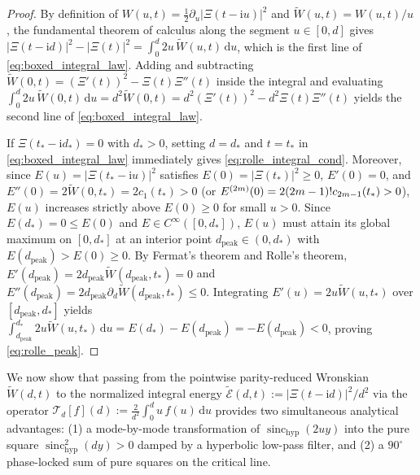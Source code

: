 \documentclass[11pt,a4paper,reqno]{amsart}
\theoremstyle{definition}
\theoremstyle{remark}
\numberwithin{equation}{section}
\newcommand{\dd}{\mathrm{d}}
\newcommand{\ii}{\mathrm{i}}
\newcommand{\Wtil}{\widetilde{W}}
\newcommand{\Etil}{\widetilde{\mathcal{E}}}
\newcommand{\sinch}{\operatorname{sinc}_{\mathrm{hyp}}}
\newcommand{\fac}{\mathclose{\mathchar"0021}}
\begin{document}
\begin{proof}
By definition of $W(u,t) = \frac{1}{2}\partial_u|\Xi(t-\ii u)|^2$ and $\Wtil(u,t) = W(u,t)/u$, the fundamental theorem of calculus along the segment $u \in [0,d]$ gives $|\Xi(t-\ii d)|^2 - |\Xi(t)|^2 = \int_0^d 2u\,\Wtil(u,t)\,\dd u$, which is the first line of \eqref{eq:boxed_integral_law}. Adding and subtracting $\Wtil(0,t) = (\Xi'(t))^2 - \Xi(t)\Xi''(t)$ inside the integral and evaluating $\int_0^d 2u\,\Wtil(0,t)\,\dd u = d^2\Wtil(0,t) = d^2(\Xi'(t))^2 - d^2\Xi(t)\Xi''(t)$ yields the second line of \eqref{eq:boxed_integral_law}.

If $\Xi(t_* - \ii d_*) = 0$ with $d_* > 0$, setting $d = d_*$ and $t = t_*$ in \eqref{eq:boxed_integral_law} immediately gives \eqref{eq:rolle_integral_cond}. Moreover, since $E(u) = |\Xi(t_* - \ii u)|^2$ satisfies $E(0) = |\Xi(t_*)|^2 \ge 0$, $E'(0) = 0$, and $E''(0) = 2\Wtil(0,t_*) = 2c_1(t_*) > 0$ (or $E^{(2m)}(0) = 2(2m-1)\fac c_{2m-1}(t_*) > 0$), $E(u)$ increases strictly above $E(0) \ge 0$ for small $u > 0$. Since $E(d_*) = 0 \le E(0)$ and $E \in C^\infty([0, d_*])$, $E(u)$ must attain its global maximum on $[0, d_*]$ at an interior point $d_{\mathrm{peak}} \in (0, d_*)$ with $E(d_{\mathrm{peak}}) > E(0) \ge 0$. By Fermat's theorem and Rolle's theorem, $E'(d_{\mathrm{peak}}) = 2d_{\mathrm{peak}}\Wtil(d_{\mathrm{peak}}, t_*) = 0$ and $E''(d_{\mathrm{peak}}) = 2d_{\mathrm{peak}}\partial_d\Wtil(d_{\mathrm{peak}}, t_*) \le 0$. Integrating $E'(u) = 2u\Wtil(u,t_*)$ over $[d_{\mathrm{peak}}, d_*]$ yields $\int_{d_{\mathrm{peak}}}^{d_*} 2u\Wtil(u,t_*)\,\dd u = E(d_*) - E(d_{\mathrm{peak}}) = -E(d_{\mathrm{peak}}) < 0$, proving \eqref{eq:rolle_peak}.
\end{proof}

We now show that passing from the pointwise parity-reduced Wronskian $\Wtil(d,t)$ to the normalized integral energy $\Etil(d,t) := |\Xi(t-\ii d)|^2/d^2$ via the operator $\mathcal{T}_d[f](d) := \frac{2}{d^2}\int_0^d u\,f(u)\,\dd u$ provides two simultaneous analytical advantages: (1) a mode-by-mode transformation of $\sinch(2u y)$ into the pure square $\sinch^2(d y) > 0$ damped by a hyperbolic low-pass filter, and (2) a $90^\circ$ phase-locked sum of pure squares on the critical line.
\end{document}
